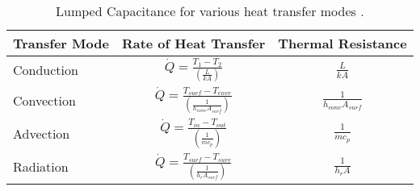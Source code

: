 

\begin{table}
\centering
\begin{tabular}{|l|c|c|}
\hline
Transfer Mode & Rate of Heat Transfer & Thermal Resistance \\
\hline
Conduction
& $\dot{Q}= \frac{T_1-T_2}{\left ( \frac{L}{kA} \right )}$
& $\frac{L}{kA}$\\
\hline
Convection
&$\dot{Q}=\frac{T_{surf}-T_{envr}}{\left ( \frac{1}{h_{conv}A_{surf}} \right )}$
&$\frac{1}{h_{conv}A_{surf}}$\\
\hline
Advection
&$\dot{Q}=\frac{T_{in}-T_{out}}{\left( \frac{1}{\dot{m}c_p} \right)}$
&$\frac{1}{\dot{m}c_p}$\\
\hline
Radiation
&$\dot{Q}=\frac{T_{surf}-T_{surr}}{\left ( \frac{1}{h_rA_{surf}} \right )}$
&$\frac{1}{h_rA}$\\
\hline
\end{tabular}
\caption{Lumped Capacitance for various heat transfer modes
\cite{wikipedia_lumped_2014}.}
\label{tab:lumpedcap}
\end{table}


